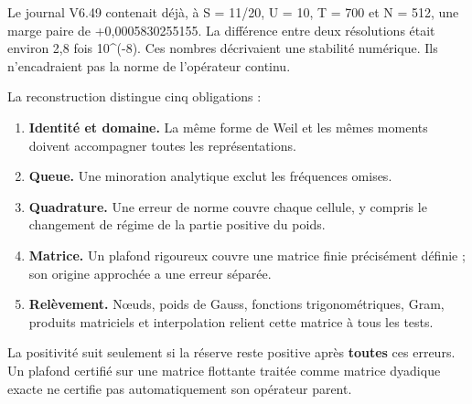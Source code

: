 \documentclass[
  10pt,
  a4paper,
]{article}
\providecommand{\tightlist}{%
  \setlength{\itemsep}{0pt}\setlength{\parskip}{0pt}}
\begin{document}
Le journal V6.49 contenait déjà, à S = 11/20, U = 10, T = 700 et N =
512, une marge paire de +0,0005830255155. La différence entre deux
résolutions était environ 2,8 fois 10\^{}(-8). Ces nombres décrivaient
une stabilité numérique. Ils n'encadraient pas la norme de l'opérateur
continu.

La reconstruction distingue cinq obligations :

\begin{enumerate}
\def\labelenumi{\arabic{enumi}.}
\tightlist
\item
  \textbf{Identité et domaine.} La même forme de Weil et les mêmes
  moments doivent accompagner toutes les représentations.
\item
  \textbf{Queue.} Une minoration analytique exclut les fréquences
  omises.
\item
  \textbf{Quadrature.} Une erreur de norme couvre chaque cellule, y
  compris le changement de régime de la partie positive du poids.
\item
  \textbf{Matrice.} Un plafond rigoureux couvre une matrice finie
  précisément définie ; son origine approchée a une erreur séparée.
\item
  \textbf{Relèvement.} Nœuds, poids de Gauss, fonctions
  trigonométriques, Gram, produits matriciels et interpolation relient
  cette matrice à tous les tests.
\end{enumerate}

La positivité suit seulement si la réserve reste positive après
\textbf{toutes} ces erreurs. Un plafond certifié sur une matrice
flottante traitée comme matrice dyadique exacte ne certifie pas
automatiquement son opérateur parent.
\end{document}
